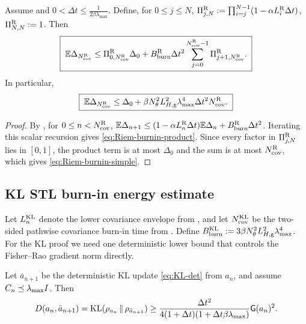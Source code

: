 \begin{theorem}
\label{thm:Riem-STL-burnin-energy}
Assume  and
$0<\Delta t\leq \frac1{2\beta\lambda_{\max}}$.
Define, for $0\leq j\leq N$,
$\Pi_{j,N}^{\mathrm{R}}:=\prod_{i=j}^{N-1}(1-\alpha L_i^{\mathrm{R}}\Delta t)$, $\Pi_{N,N}^{\mathrm{R}}:=1$.
Then
\begin{equation}
\label{eq:Riem-burnin-product}
    \boxed{\;
    \mathbb{E}\Delta_{N_{\mathrm{cov}}^{\mathrm{R}}}
    \leq
    \Pi_{0,N_{\mathrm{cov}}^{\mathrm{R}}}^{\mathrm{R}}\Delta_0
    +
    B_{\mathrm{burn}}^{\mathrm{R}}\Delta t^2
    \sum_{j=0}^{N_{\mathrm{cov}}^{\mathrm{R}}-1}
    \Pi_{j+1,N_{\mathrm{cov}}^{\mathrm{R}}}^{\mathrm{R}}.
    \;}
\end{equation}
In particular,
\begin{equation}
\label{eq:Riem-burnin-simple}
    \boxed{\;
    \mathbb{E}\Delta_{N_{\mathrm{cov}}^{\mathrm{R}}}
    \leq
    \Delta_0
    +
    \beta N_\theta^2L_{H,\mathrm g}^2\lambda_{\max}^4\Delta t^2
    N_{\mathrm{cov}}^{\mathrm{R}}.
    \;}
\end{equation}
\end{theorem}

\begin{proof}
By , for $0\leq n<N_{\mathrm{cov}}^{\mathrm{R}}$,
$\mathbb{E}\Delta_{n+1}\leq(1-\alpha L_n^{\mathrm{R}}\Delta t)\mathbb{E}\Delta_n+B_{\mathrm{burn}}^{\mathrm{R}}\Delta t^2$.
Iterating this scalar recursion gives \eqref{eq:Riem-burnin-product}. Since every factor in
$\Pi_{j,N}^{\mathrm{R}}$ lies in $[0,1]$, the product term is at most $\Delta_0$ and the sum is at
most $N_{\mathrm{cov}}^{\mathrm{R}}$, which gives \eqref{eq:Riem-burnin-simple}.
\end{proof}

\subsection{KL STL burn-in energy estimate}

Let $L_n^{\mathrm{KL}}$ denote the lower covariance envelope from , and let
$N_{\mathrm{cov}}^{\mathrm{KL}}$ be the two-sided pathwise covariance burn-in time from
. Define
$B_{\mathrm{burn}}^{\mathrm{KL}}:=3\beta N_\theta^2L_{H,\mathrm g}^2\lambda_{\max}^4$.
For the KL proof we need one deterministic lower bound that controls the Fisher--Rao
gradient norm directly.

\begin{lemma}
\label{lem:KL-FR-D-lower}
Let $\bar a_{n+1}$ be the deterministic KL update \eqref{eq:KL-det} from $a_n$, and assume
$C_n\preceq\lambda_{\max}I$. Then
\[
    D(a_n,\bar a_{n+1})
    =
    \mathrm{KL}(\rho_{a_n}\,\|\,\rho_{\bar a_{n+1}})
    \geq
    \frac{\Delta t^2}{4(1+\Delta t)(1+\Delta t\beta\lambda_{\max})}
    \mathsf{G}(a_n)^2 .
\]
\end{lemma}

